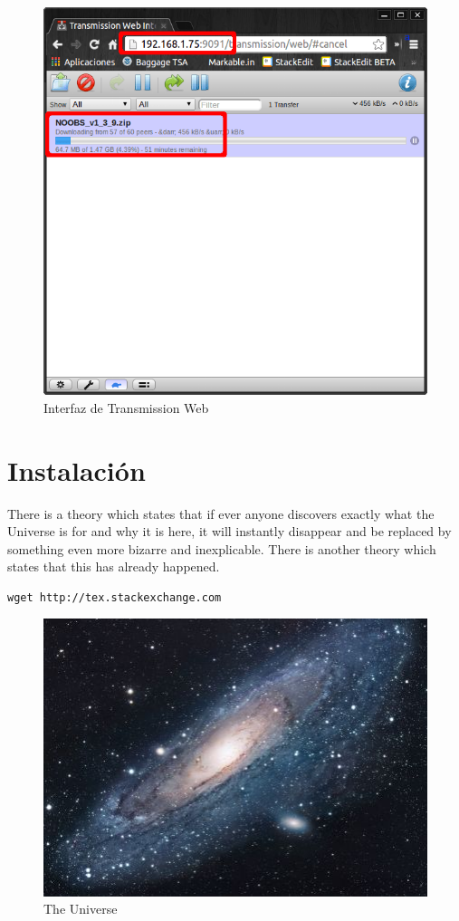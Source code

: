 \documentclass{article}
\begin{document}
\begin{figure}[h!]
\centering
\includegraphics[scale=0.5]{torrent20.png}
\caption{Interfaz de Transmission Web}
\label{fig:torrent1}
\end{figure}


\section{Instalación}
There is a theory which states that if ever anyone discovers exactly what the Universe is for and why it is here, it will instantly disappear and be replaced by something even more bizarre and inexplicable.
There is another theory which states that this has already happened.


\begin{verbatim}
wget http://tex.stackexchange.com  
\end{verbatim}

\begin{figure}[h!]
\centering
\includegraphics[scale=1.7]{universe.jpg}
\caption{The Universe}
\label{fig:univerise}
\end{figure}
\end{document}
